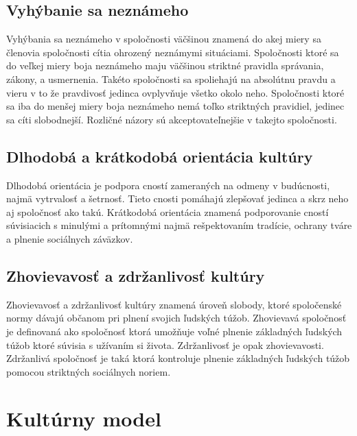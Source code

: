 \documentclass[10pt,twoside,slovak,a4paper]{article}
\begin{document}
\subsection{Vyhýbanie sa neznámeho}\label{kultura:vyhybanie}

Vyhýbania sa neznámeho v spoločnosti väčšinou znamená do akej miery sa členovia spoločnosti
cítia ohrozený neznámymi situáciami. Spoločnosti ktoré sa do veľkej miery boja neznámeho
maju väčšinou striktné pravidla správania, zákony, a usmernenia. Takéto spoločnosti sa spoliehajú
na absolútnu pravdu a vieru v to že pravdivosť jedinca ovplyvňuje všetko okolo neho. Spoločnosti
ktoré sa iba do menšej miery boja neznámeho nemá toľko striktných pravidiel, jedinec sa cíti
slobodnejší. Rozličné názory sú akceptovateľnejšie v takejto spoločnosti.

\subsection{Dlhodobá a krátkodobá orientácia kultúry}\label{kultura:cnosti}

Dlhodobá orientácia je podpora cností zameraných na odmeny v budúcnosti, najmä vytrvalosť a šetrnosť.
Tieto cnosti pomáhajú zlepšovať jedinca a skrz neho aj spoločnosť ako takú. Krátkodobá orientácia
znamená podporovanie cností súvisiacich s minulými a prítomnými najmä rešpektovaním tradície, ochrany
tváre a plnenie sociálnych záväzkov.

\subsection{Zhovievavosť a zdržanlivosť kultúry}\label{kultura:obmedzenia}

Zhovievavosť a zdržanlivosť kultúry znamená úroveň slobody, ktoré spoločenské normy
dávajú občanom pri plnení svojich ľudských túžob. Zhovievavá spoločnosť je definovaná
ako spoločnosť ktorá umožňuje voľné plnenie základných ľudských túžob ktoré súvisia s
užívaním si života. Zdržanlivosť je opak zhovievavosti. Zdržanlivá spoločnosť je taká
ktorá kontroluje plnenie základných ľudských túžob pomocou striktných sociálnych noriem.


\pagebreak

\section{Kultúrny model}\label{reakcie}
\pagebreak
\end{document}

